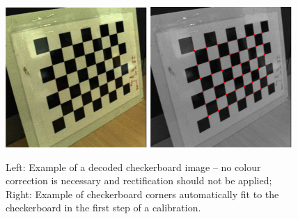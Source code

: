 \documentclass[onecolumn]{article}
\begin{document}
\begin{figure}[tbh]
	\centering
	\includegraphics[width=0.48\textwidth]{Figs/CheckerboardExample}
	\includegraphics[width=0.48\textwidth]{Figs/CheckerboardMatchingExample}
	\caption{Left: Example of a decoded checkerboard image -- no colour correction is necessary and rectification should not be applied; Right: Example of checkerboard corners automatically fit to the checkerboard in the first step of a calibration.}
	\label{fig_CheckerboardAndCorners}
\end{figure}
\end{document}
